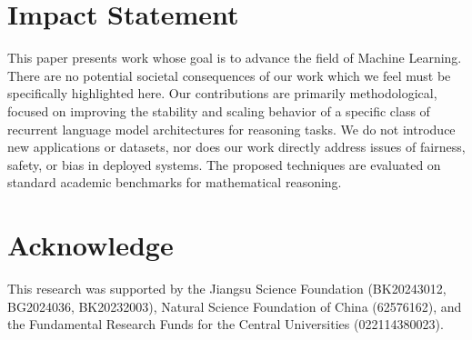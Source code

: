 \documentclass{article}
\theoremstyle{plain}
\theoremstyle{definition}
\theoremstyle{remark}
\begin{document}
 \section*{Impact Statement}
 This paper presents work whose goal is to advance the field of Machine Learning. There are no potential societal consequences of our work which we feel must be specifically highlighted here. Our contributions are primarily methodological, focused on improving the stability and scaling behavior of a specific class of recurrent language model architectures for reasoning tasks. We do not introduce new applications or datasets, nor does our work directly address issues of fairness, safety, or bias in deployed systems. The proposed techniques are evaluated on standard academic benchmarks for mathematical reasoning.

 \section*{Acknowledge}
 This research was supported by the Jiangsu Science Foundation (BK20243012,  BG2024036, BK20232003), Natural Science Foundation of China (62576162), and the Fundamental Research Funds for the Central Universities (022114380023).



\newpage
\appendix
\onecolumn

\end{document}
